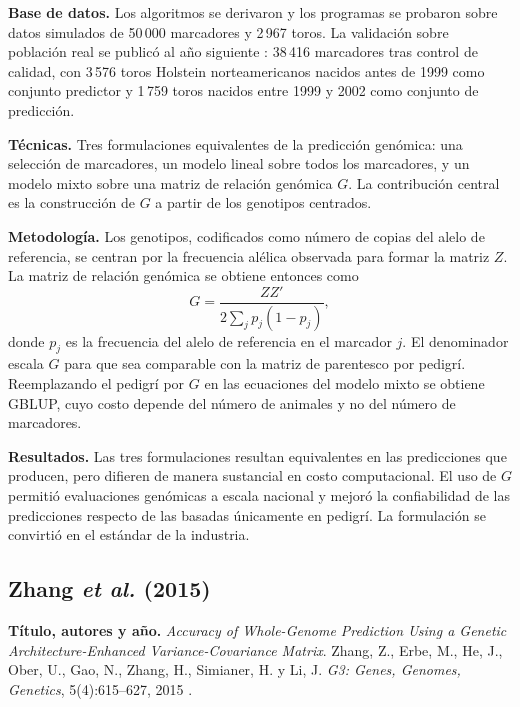 \documentclass[conference]{IEEEtran}
\begin{document}
\textbf{Base de datos.} Los algoritmos se derivaron y los programas se
probaron sobre datos simulados de 50\,000 marcadores y 2\,967 toros. La
validación sobre población real se publicó al año siguiente
\cite{vanraden2009}: 38\,416 marcadores tras control de calidad, con
3\,576 toros Holstein norteamericanos nacidos antes de 1999 como
conjunto predictor y 1\,759 toros nacidos entre 1999 y 2002 como
conjunto de predicción.

\textbf{Técnicas.} Tres formulaciones equivalentes de la predicción
genómica: una selección de marcadores, un modelo lineal sobre todos los
marcadores, y un modelo mixto sobre una matriz de relación genómica $G$.
La contribución central es la construcción de $G$ a partir de los
genotipos centrados.

\textbf{Metodología.} Los genotipos, codificados como número de copias
del alelo de referencia, se centran por la frecuencia alélica observada
para formar la matriz $Z$. La matriz de relación genómica se obtiene
entonces como
\begin{equation}
G = \frac{Z Z'}{2\sum_{j} p_j (1 - p_j)},
\label{eq:vanraden}
\end{equation}
donde $p_j$ es la frecuencia del alelo de referencia en el marcador $j$.
El denominador escala $G$ para que sea comparable con la matriz de
parentesco por pedigrí. Reemplazando el pedigrí por $G$ en las ecuaciones
del modelo mixto se obtiene GBLUP, cuyo costo depende del número de
animales y no del número de marcadores.

\textbf{Resultados.} Las tres formulaciones resultan equivalentes en las
predicciones que producen, pero difieren de manera sustancial en costo
computacional. El uso de $G$ permitió evaluaciones genómicas a escala
nacional y mejoró la confiabilidad de las predicciones respecto de las
basadas únicamente en pedigrí. La formulación se convirtió en el estándar
de la industria.

\subsection{Zhang \textit{et al.} (2015)}

\textbf{Título, autores y año.} \textit{Accuracy of Whole-Genome
Prediction Using a Genetic Architecture-Enhanced Variance-Covariance
Matrix}. Zhang, Z., Erbe, M., He, J., Ober, U., Gao, N., Zhang, H.,
Simianer, H. y Li, J. \textit{G3: Genes, Genomes, Genetics},
5(4):615--627, 2015 \cite{zhang2015}.
\end{document}
